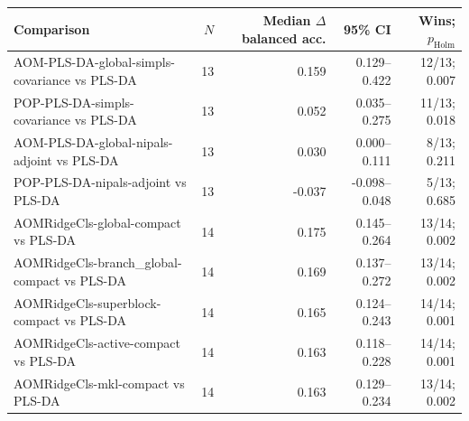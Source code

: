 \begin{tabularx}{\linewidth}{Xrrrr}
\toprule
Comparison & $N$ & Median $\Delta$ balanced acc. & 95\% CI & Wins; $p_{\mathrm{Holm}}$ \\
\midrule
AOM-\allowbreak{}PLS-\allowbreak{}DA-\allowbreak{}global-\allowbreak{}simpls-\allowbreak{}covariance vs PLS-\allowbreak{}DA & 13 & 0.159 & 0.129--0.422 & 12/13; 0.007 \\
POP-\allowbreak{}PLS-\allowbreak{}DA-\allowbreak{}simpls-\allowbreak{}covariance vs PLS-\allowbreak{}DA & 13 & 0.052 & 0.035--0.275 & 11/13; 0.018 \\
AOM-\allowbreak{}PLS-\allowbreak{}DA-\allowbreak{}global-\allowbreak{}nipals-\allowbreak{}adjoint vs PLS-\allowbreak{}DA & 13 & 0.030 & 0.000--0.111 & 8/13; 0.211 \\
POP-\allowbreak{}PLS-\allowbreak{}DA-\allowbreak{}nipals-\allowbreak{}adjoint vs PLS-\allowbreak{}DA & 13 & -0.037 & -0.098--0.048 & 5/13; 0.685 \\
AOMRidgeCls-\allowbreak{}global-\allowbreak{}compact vs PLS-\allowbreak{}DA & 14 & 0.175 & 0.145--0.264 & 13/14; 0.002 \\
AOMRidgeCls-\allowbreak{}branch\_\allowbreak{}global-\allowbreak{}compact vs PLS-\allowbreak{}DA & 14 & 0.169 & 0.137--0.272 & 13/14; 0.002 \\
AOMRidgeCls-\allowbreak{}superblock-\allowbreak{}compact vs PLS-\allowbreak{}DA & 14 & 0.165 & 0.124--0.243 & 14/14; 0.001 \\
AOMRidgeCls-\allowbreak{}active-\allowbreak{}compact vs PLS-\allowbreak{}DA & 14 & 0.163 & 0.118--0.228 & 14/14; 0.001 \\
AOMRidgeCls-\allowbreak{}mkl-\allowbreak{}compact vs PLS-\allowbreak{}DA & 14 & 0.163 & 0.129--0.234 & 13/14; 0.002 \\
\bottomrule
\end{tabularx}
